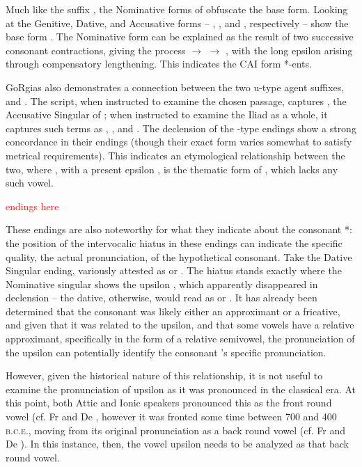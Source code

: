 \documentclass[draft]{turabian-researchpaper}
\begin{document}
Much like the suffix , the Nominative forms of 
obfuscate the base form. Looking at the Genitive, Dative, and Accusative
forms -- , , and , respectively --
show the base form . The Nominative form can be explained
as the result of two successive consonant contractions, giving the
process  $\to$  $\to$ , with
the long epsilon 
arising through compensatory
lengthening. This indicates the CAI form *-\w ents.

 GoRgias also demonstrates a connection between the two
u-type agent suffixes,  and . The script, when
instructed to examine the chosen passage, captures , the
Accusative Singular of ; when instructed to examine the
Iliad as a whole, it captures such terms as ,
, and . The declension of the -type
endings show a strong concordance in their endings (though
their exact form varies somewhat to satisfy metrical requirements).
This indicates an etymological relationship between the two, where
, with a present epsilon , is the
thematic form of , which lacks any such vowel. 

\textcolor{red}{ endings here}

These endings are also noteworthy for what they indicate about the
consonant *\w: the position of the intervocalic hiatus in these
endings can indicate the specific quality, the actual pronunciation,
of the hypothetical consonant.
Take the Dative Singular ending, variously attested as 
or . The hiatus stands exactly where the Nominative
singular shows the upsilon , which apparently
disappeared in declension -- the dative, otherwise, would read as
 or . It has already been determined
that the consonant was likely either an approximant or a fricative,
and given that it was related to the upsilon, and that some vowels
have a relative approximant, specifically in the form of a relative
semivowel, the pronunciation of the upsilon
can potentially identify the consonant \w's specific pronunciation.

However, given the historical nature of this relationship, it is not
useful to examine the pronunciation of upsilon  as it was
pronounced in the classical era. At this point, both Attic and
Ionic speakers pronounced this as the front round vowel 
(cf. Fr  and De , however it
was fronted some time between 700 and 400 \textsc{b.c.e.}, moving
from its original pronunciation as a back round vowel  (cf.
Fr  and De ).\autocite[529]{malikouti-drachman_bortone_2015}
In this instance, then, the vowel upsilon  needs to be
analyzed as that back round vowel. 
\end{document}
